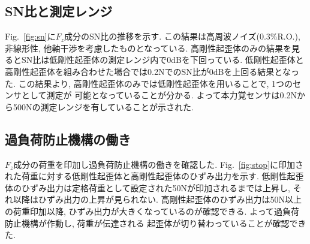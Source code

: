 \subsection{SN比と測定レンジ}
Fig.~\ref{fig:sn}に$F_z$成分のSN比の推移を示す. 
この結果は高周波ノイズ(0.3\%R.O.), 非線形性, 他軸干渉を考慮したものとなっている. 
高剛性起歪体のみの結果を見るとSN比は低剛性起歪体の測定レンジ内で0dBを下回っている.  
低剛性起歪体と高剛性起歪体を組み合わせた場合では0.2NでのSN比が0dBを上回る結果となった. 
この結果より, 高剛性起歪体のみでは低剛性起歪体を用いることで, 1つのセンサとして測定が
可能となっていることが分かる.  
よって本力覚センサは0.2Nから500Nの測定レンジを有していることが示された. 

\subsection{過負荷防止機構の働き}
$F_z$成分の荷重を印加し過負荷防止機構の働きを確認した.
Fig.~\ref{fig:stop}に印加された荷重に対する低剛性起歪体と高剛性起歪体のひずみ出力を示す.
低剛性起歪体のひずみ出力は定格荷重として設定された50Nが印加されるまでは上昇し, 
それ以降はひずみ出力の上昇が見られない. 高剛性起歪体のひずみ出力は50N以上の荷重印加以降,
ひずみ出力が大きくなっているのが確認できる. よって過負荷防止機構が作動し, 荷重が伝達される
起歪体が切り替わっていることが確認できた. 
